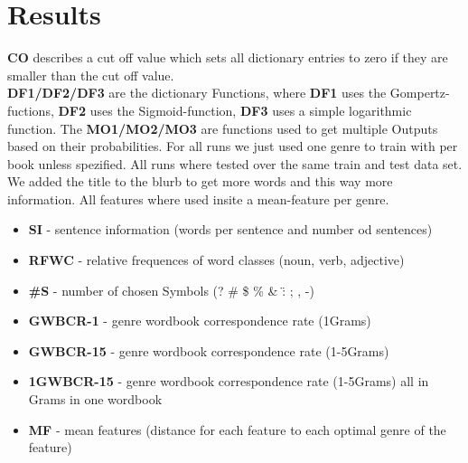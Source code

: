 \documentclass{article}
\begin{document}
\section{Results}

\textbf{CO} describes a cut off value which sets all dictionary entries to zero if they are smaller than the cut off value.\\
\textbf{DF1/DF2/DF3} are the dictionary Functions, where \textbf{DF1} uses the Gompertz-fuctions, \textbf{DF2} uses the Sigmoid-function, \textbf{DF3} uses a simple logarithmic function.
The \textbf{MO1/MO2/MO3} are functions used to get multiple Outputs based on their probabilities.
For all runs we just used one genre to train with per book unless spezified. All runs where tested over the same train and test data set. We added the title to the blurb to get more words and this way more information. All features where used insite a mean-feature per genre.\\

\begin{itemize}
    \item \textbf{SI} - sentence information (words per sentence and number od sentences)
    \item \textbf{RFWC} - relative frequences of word classes (noun, verb, adjective)
    \item \textbf{\#S} - number of chosen Symbols (? \# \$ \% \& \" : ; , -)
    \item \textbf{GWBCR-1} - genre wordbook correspondence rate (1Grams)
    \item \textbf{GWBCR-15} - genre wordbook correspondence rate (1-5Grams)
    \item \textbf{1GWBCR-15} - genre wordbook correspondence rate (1-5Grams) all in Grams in one wordbook
    \item \textbf{MF} - mean features (distance for each feature to each optimal genre of the feature)
\end{itemize}
\end{document}
